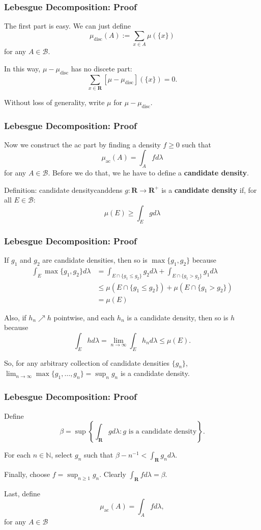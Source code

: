 \documentclass[handout]{beamer}
\begin{document}
\frame
{
\frametitle{Lebesgue Decomposition: Proof} 

The first part is easy. We can just define 
$$
\mu_{\text{disc}} ( A ) := \sum_{x \in A} \mu(\{x\})
$$
for any $A \in \mathcal{B}$.
\newline

In this way, $\mu - \mu_{\text{disc}}$ has no discete part:
$$
\sum_{x \in \mathbf{R}} \left[\mu - \mu_{\text{disc}}\right](\{x\}) = 0.
$$

Without loss of generality, write $\mu$ for $\mu - \mu_{\text{disc}}$.
}


\frame
{
\frametitle{Lebesgue Decomposition: Proof} 

Now we construct the ac part by finding a density $f \ge 0$ such that
$$
\mu_{\text{ac}}(A) = \int_A f d\lambda
$$
for any $A \in \mathcal{B}$. Before we do that, we he have to define a { \bf candidate density}.

\begin{mytheo}{Definition: candidate density}{canddens}
$g : \mathbf{R} \to \mathbf{R}^+$ is a {\bf candidate density} if, for all $E \in \mathcal{B}$:
$$
\mu(E) \ge \int_E g d\lambda
$$
\end{mytheo}

}


\frame
{
\frametitle{Lebesgue Decomposition: Proof} 

If $g_1$ and $g_2$ are candidate densities, then so is $\max\{g_1,g_2\}$ because
\begin{align*}
\int_E \max\{g_1,g_2\} d\lambda 
&= \int_{E \cap \{g_1 \le g_2\}} g_2 d\lambda + \int_{E \cap \{g_1 > g_2\}} g_1 d\lambda \\ 
&\le \mu(E \cap \{g_1 \le g_2\}) + \mu(E \cap \{g_1 > g_2\}) \\
&= \mu(E)
\end{align*}

Also, if $h_n \nearrow h$ pointwise, and each $h_n$ is a candidate density, then so is $h$ because
$$
\int_E h d\lambda = \lim_{n \to \infty}\int_E h_n d\lambda \le \mu(E).
$$

So, for any arbitrary collection of candidate densities $\{g_n\}$, $\lim_{n \to \infty} \max\{g_1, \ldots, g_n \} = \sup_n g_n$ is a candidate density.

}

\frame
{
\frametitle{Lebesgue Decomposition: Proof} 

Define 
$$
\beta = \sup \left\{ \int_{\mathbf{R}} g d\lambda : g \text{ is a candidate density} \right\}.
$$

For each $n \in \mathbb{N}$, select $g_n$ such that $\beta - n^{-1} < \int_{\mathbf{R}} g_n d \lambda$.
\newline

Finally, choose $f = \sup_{n \ge 1} g_n$. Clearly $\int_{\mathbf{R}} f d\lambda = \beta$. 
\newline

Last, define
$$
\mu_{\text{ac}}(A) = \int_A f d\lambda,
$$
for any $A \in \mathcal{B}$


}
\end{document}
